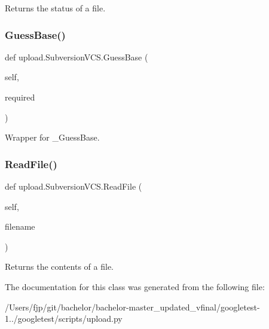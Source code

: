 \begin{DoxyVerb}Returns the status of a file.\end{DoxyVerb}
 \mbox{\label{classupload_1_1_subversion_v_c_s_a7d22d459469a757270502ce0dccacbd2}} 
\subsubsection{\texorpdfstring{Guess\+Base()}{GuessBase()}}
{\footnotesize\ttfamily def upload.\+Subversion\+V\+C\+S.\+Guess\+Base (\begin{DoxyParamCaption}\item[{}]{self,  }\item[{}]{required }\end{DoxyParamCaption})}

\begin{DoxyVerb}Wrapper for _GuessBase.\end{DoxyVerb}
 \mbox{\label{classupload_1_1_subversion_v_c_s_a340d269b74386ac863636f6b0683d9f4}} 
\subsubsection{\texorpdfstring{Read\+File()}{ReadFile()}}
{\footnotesize\ttfamily def upload.\+Subversion\+V\+C\+S.\+Read\+File (\begin{DoxyParamCaption}\item[{}]{self,  }\item[{}]{filename }\end{DoxyParamCaption})}

\begin{DoxyVerb}Returns the contents of a file.\end{DoxyVerb}
 

The documentation for this class was generated from the following file\+:\begin{DoxyCompactItemize}
\item 
/\+Users/fjp/git/bachelor/bachelor-\/master\+\_\+updated\+\_\+vfinal/googletest-\/1../googletest/scripts/upload.\+py\end{DoxyCompactItemize}
